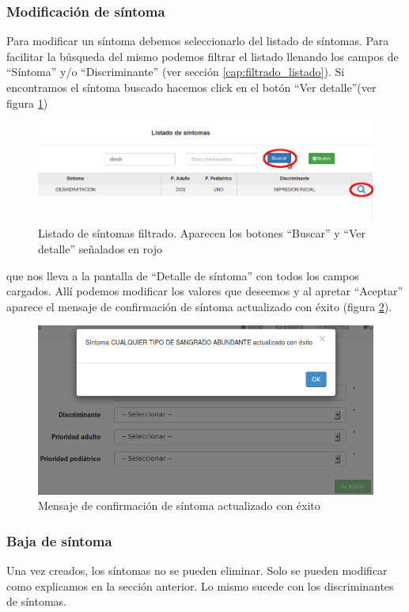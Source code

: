 \subsubsection{Modificación de síntoma}\label{cap:modificacion_sintoma}
Para modificar un síntoma debemos seleccionarlo del listado de síntomas. Para facilitar la búsqueda del mismo podemos filtrar el listado llenando los campos de ``Síntoma'' y/o ``Discriminante'' (ver sección \ref{cap:filtrado_listado}). Si encontramos el síntoma buscado hacemos click en el botón ``Ver detalle''(ver figura \ref{fig:sintomas_filtro}) 
\begin{figure}
\centerline{\includegraphics[width=1\textwidth]{sintomas_listado_buscar.png}}
\caption{Listado de síntomas filtrado. Aparecen los botones ``Buscar'' y ``Ver detalle'' señalados en rojo}
\label{fig:sintomas_filtro}
\end{figure}
que nos lleva a la pantalla de ``Detalle de síntoma'' con todos los campos cargados. Allí podemos modificar los valores que deseemos y al apretar ``Aceptar'' aparece el mensaje de confirmación de síntoma actualizado con éxito (figura \ref{fig:sintoma_actualizado_con_exito}).
\begin{figure}
\centerline{\includegraphics[width=1\textwidth]{sintoma_actualizado_con_exito.png}}
\caption{Mensaje de confirmación de síntoma actualizado con éxito}
\label{fig:sintoma_actualizado_con_exito}
\end{figure}

\subsubsection{Baja de síntoma}
Una vez creados, los síntomas no se pueden eliminar. Solo se pueden modificar como explicamos en la sección anterior. Lo mismo sucede con los discriminantes de síntomas.

